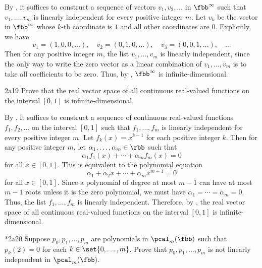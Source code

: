 \begin{sol}
    By , it suffices to construct a sequence of vectors $v_1, v_2, \ldots$ in $\fbb^\infty$ such that $v_1, \ldots, v_m$ is linearly independent for every positive integer $m$.
	Let $v_k$ be the vector in $\fbb^\infty$ whose $k$-th coordinate is $1$ and all other coordinates are $0$.
	Explicitly, we have
    \[
    	v_1 = (1, 0, 0, \ldots), \quad v_2 = (0, 1, 0, \ldots), \quad v_3 = (0, 0, 1, \ldots), \quad \ldots
    \]
    Then for any positive integer $m$, the list $v_1, \ldots, v_m$ is linearly independent, since the only way to write the zero vector as a linear combination of $v_1, \ldots, v_m$ is to take all coefficients to be zero.
	Thus, by , $\fbb^\infty$ is infinite-dimensional.
\end{sol}
 
\begin{exercise}{2a19}
    Prove that the real vector space of all continuous real-valued functions on the interval $[0, 1]$ is infinite-dimensional.
\end{exercise}

\begin{sol}
    By , it suffices to construct a sequence of continuous real-valued functions $f_1, f_2, \ldots$ on the interval $[0, 1]$ such that $f_1, \ldots, f_m$ is linearly independent for every positive integer $m$.
	Let $f_k(x) = x^{k-1}$ for each positive integer $k$.
	Then for any positive integer $m$, let $\alpha_1, \ldots, \alpha_m \in \rbb$ such that
    \[
    	\alpha_1 f_1(x) + \cdots + \alpha_m f_m(x) = 0
    \]
    for all $x \in [0, 1]$.
	This is equivalent to the polynomial equation
    \[
    	\alpha_1 + \alpha_2 x + \cdots + \alpha_m x^{m-1} = 0
    \]
    for all $x \in [0, 1]$.
	Since a polynomial of degree at most $m - 1$ can have at most $m - 1$ roots unless it is the zero polynomial, we must have $\alpha_1 = \cdots = \alpha_m = 0$.
	Thus, the list $f_1, \ldots, f_m$ is linearly independent.
	Therefore, by , the real vector space of all continuous real-valued functions on the interval $[0, 1]$ is infinite-dimensional.
\end{sol}
 
\begin{exercise}*{2a20}
    Suppose $p_0, p_1, \ldots, p_m$ are polynomials in $\pcal_m(\fbb)$ such that $p_k(2) = 0$ for each $k \in \set{0, \ldots, m}$.
	Prove that $p_0, p_1, \ldots, p_m$ is not linearly independent in $\pcal_m(\fbb)$.
\end{exercise}

